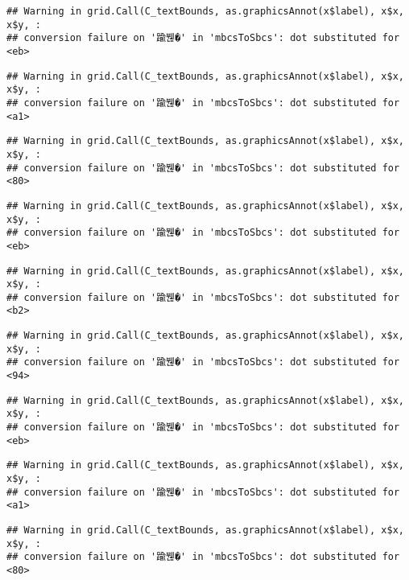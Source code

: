 \documentclass[
]{article}
\begin{document}
\begin{verbatim}
## Warning in grid.Call(C_textBounds, as.graphicsAnnot(x$label), x$x, x$y, :
## conversion failure on '踰붾�' in 'mbcsToSbcs': dot substituted for <eb>
\end{verbatim}

\begin{verbatim}
## Warning in grid.Call(C_textBounds, as.graphicsAnnot(x$label), x$x, x$y, :
## conversion failure on '踰붾�' in 'mbcsToSbcs': dot substituted for <a1>
\end{verbatim}

\begin{verbatim}
## Warning in grid.Call(C_textBounds, as.graphicsAnnot(x$label), x$x, x$y, :
## conversion failure on '踰붾�' in 'mbcsToSbcs': dot substituted for <80>
\end{verbatim}

\begin{verbatim}
## Warning in grid.Call(C_textBounds, as.graphicsAnnot(x$label), x$x, x$y, :
## conversion failure on '踰붾�' in 'mbcsToSbcs': dot substituted for <eb>
\end{verbatim}

\begin{verbatim}
## Warning in grid.Call(C_textBounds, as.graphicsAnnot(x$label), x$x, x$y, :
## conversion failure on '踰붾�' in 'mbcsToSbcs': dot substituted for <b2>
\end{verbatim}

\begin{verbatim}
## Warning in grid.Call(C_textBounds, as.graphicsAnnot(x$label), x$x, x$y, :
## conversion failure on '踰붾�' in 'mbcsToSbcs': dot substituted for <94>
\end{verbatim}

\begin{verbatim}
## Warning in grid.Call(C_textBounds, as.graphicsAnnot(x$label), x$x, x$y, :
## conversion failure on '踰붾�' in 'mbcsToSbcs': dot substituted for <eb>
\end{verbatim}

\begin{verbatim}
## Warning in grid.Call(C_textBounds, as.graphicsAnnot(x$label), x$x, x$y, :
## conversion failure on '踰붾�' in 'mbcsToSbcs': dot substituted for <a1>
\end{verbatim}

\begin{verbatim}
## Warning in grid.Call(C_textBounds, as.graphicsAnnot(x$label), x$x, x$y, :
## conversion failure on '踰붾�' in 'mbcsToSbcs': dot substituted for <80>
\end{verbatim}
\end{document}
